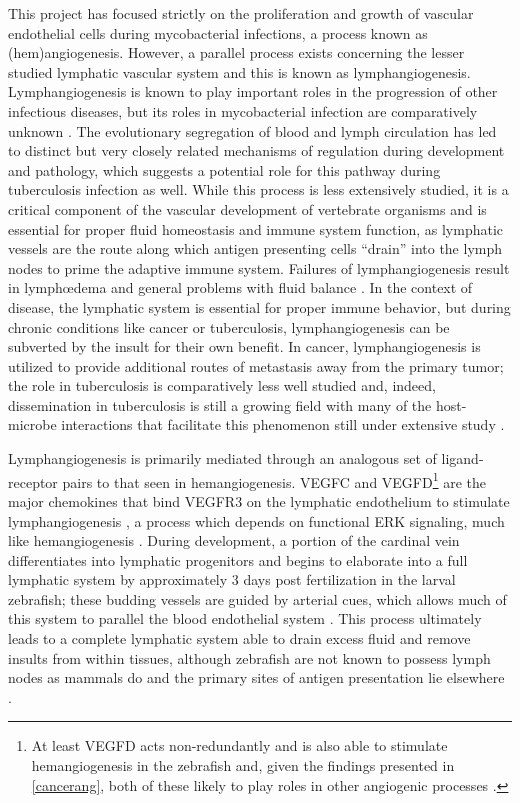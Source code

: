 This project has focused strictly on the proliferation and growth of vascular endothelial cells during mycobacterial infections, a process known as (hem)angiogenesis. However, a parallel process exists concerning the lesser studied lymphatic vascular system and this is known as lymphangiogenesis. Lymphangiogenesis is known to play important roles in the progression of other infectious diseases, but its roles in mycobacterial infection are comparatively unknown \citep{Bowlin2021}. The evolutionary segregation of blood and lymph circulation has led to distinct but very closely related mechanisms of regulation during development and pathology, which suggests a potential role for this pathway during tuberculosis infection as well. While this process is less extensively studied, it is a critical component of the vascular development of vertebrate organisms and is essential for proper fluid homeostasis and immune system function, as lymphatic vessels are the route along which antigen presenting cells ``drain'' into the lymph nodes to prime the adaptive immune system. Failures of lymphangiogenesis result in lymph\oe dema and general problems with fluid balance \citep{Makinen2001}. In the context of disease, the lymphatic system is essential for proper immune behavior, but during chronic conditions like cancer or tuberculosis, lymphangiogenesis can be subverted by the insult for their own benefit. In cancer, lymphangiogenesis is utilized to provide additional routes of metastasis away from the primary tumor; the role in tuberculosis is comparatively less well studied \citep{Huang2010, Augustin2009, Duong2012, Stacker2014} and, indeed, dissemination in tuberculosis is still a growing field with many of the host\hyp{}microbe interactions that facilitate this phenomenon still under extensive study \citep{Saelens2022}.

Lymphangiogenesis is primarily mediated through an analogous set of ligand\hyp{}receptor pairs to that seen in hemangiogenesis. VEGFC and VEGFD\footnote{At least VEGFD acts non\hyp{}redundantly and is also able to stimulate hemangiogenesis in the zebrafish and, given the findings presented in \autoref{cancerang}, both of these likely to play roles in other angiogenic processes \citep{Bower2017a}.} are the major  chemokines that bind VEGFR3 on the lymphatic endothelium to stimulate lymphangiogenesis \citep{Alitalo2005, Kuchler2006, Haiko2008}, a process which depends on functional ERK signaling, much like hemangiogenesis \citep{Shin2017, Shin2016}. During development, a portion of the cardinal vein differentiates into lymphatic progenitors \citep{Yaniv2006, Nicenboim2015} and begins to elaborate into a full lymphatic system by approximately 3 days post fertilization in the larval zebrafish; these budding vessels are guided by arterial cues, which allows much of this system to parallel the blood endothelial system \citep{Jung2017, Bussmann2010}. This process ultimately leads to a complete lymphatic system able to drain excess fluid and remove insults from within tissues, although zebrafish are not known to possess lymph nodes as mammals do and the primary sites of antigen presentation lie elsewhere \citep{vanLessen2017, Onder2017, Korbut2016}.


